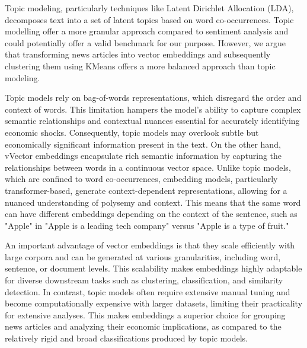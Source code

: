 Topic modeling, particularly techniques like Latent Dirichlet Allocation (LDA), decomposes text into a set of latent topics based on word co-occurrences. Topic modelling  offer a more granular approach compared to sentiment analysis and could potentially offer a valid benchmark for our purpose. However, we argue that transforming news articles into vector embeddings and subsequently clustering them using KMeans offers a more balanced approach than topic modeling.

Topic models rely on bag-of-words representations, which disregard the order and context of words. This limitation hampers the model's ability to capture complex semantic relationships and contextual nuances essential for accurately identifying economic shocks. Consequently, topic models may overlook subtle but economically significant information present in the text. On the other hand, vVector embeddings encapsulate rich semantic information by capturing the relationships between words in a continuous vector space. Unlike topic models, which are confined to word co-occurrences, embedding models, particularly transformer-based, generate context-dependent representations, allowing for a nuanced understanding of polysemy and context. This means that the same word can have different embeddings depending on the context of the sentence, such as "Apple" in "Apple is a leading tech company" versus "Apple is a type of fruit." 


An important advantage of vector embeddings is that they scale efficiently with large corpora and can be generated at various granularities, including word, sentence, or document levels. This scalability makes embeddings highly adaptable for diverse downstream tasks such as clustering, classification, and similarity detection. In contrast, topic models often require extensive manual tuning and become computationally expensive with larger datasets, limiting their practicality for extensive analyses. This makes embeddings a superior choice for grouping news articles and analyzing their economic implications, as compared to the relatively rigid and broad classifications produced by topic models.

